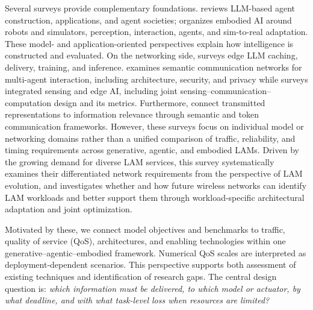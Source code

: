 \documentclass[letterpaper,journal]{IEEEtran}
\begin{document}
Several surveys provide complementary foundations. \cite{agentsurvey}
reviews LLM-based agent construction, applications, and agent societies;
\cite{embodiedsurvey} organizes embodied AI around robots and simulators,
perception, interaction, agents, and sim-to-real adaptation.
These model- and application-oriented perspectives
explain how intelligence is constructed and evaluated. On the networking
side, \cite{edgeLLMsurvey} surveys edge LLM caching, delivery, training, and
inference. \cite{semcomnetsurvey} examines semantic communication networks
for multi-agent interaction, including architecture, security, and privacy
while \cite{isea} surveys integrated sensing and edge AI, including joint
sensing--communication--computation design and its metrics. Furthermore,
\cite{semanticclassic,tokcom} connect transmitted representations to
information relevance through semantic and token communication frameworks.
However, these surveys focus on individual model or networking domains
rather than a unified comparison of traffic, reliability, and timing
requirements across generative, agentic, and embodied LAMs. Driven by the
growing demand for diverse LAM services, this survey systematically examines
their differentiated network requirements from the perspective of LAM
evolution, and investigates whether and how future wireless networks can
identify LAM workloads and better support them through workload-specific
architectural adaptation and joint optimization.

Motivated by these, we connect model objectives and benchmarks to
traffic, quality of service (QoS), architectures, and enabling technologies
within one generative--agentic--embodied framework. Numerical QoS scales are
interpreted as deployment-dependent scenarios. This perspective supports
both assessment of existing techniques and identification of research gaps.
The central design question is:
\emph{which information must be delivered, to which model or actuator, by
what deadline, and with what task-level loss when resources are limited?}

\end{document}
